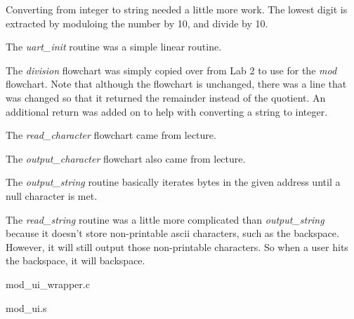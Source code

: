 \documentclass[letterpaper,10pt]{article}
\begin{document}
    Converting from integer to string needed a little more work. The lowest
    digit is extracted by moduloing the number by 10, and divide by 10.

    

    The \textit{uart\_init} routine was a simple linear routine.
    

    The \textit{division} flowchart was simply copied over from Lab 2 to use
    for the \textit{mod} flowchart. Note that although the flowchart is
    unchanged, there was a line that was changed so that it returned the
    remainder instead of the quotient. An additional return was added on
    to help with converting a string to integer.

    

    The \textit{read\_character} flowchart came from lecture.
    

    The \textit{output\_character} flowchart also came from lecture.
    

    The \textit{output\_string} routine basically iterates bytes in the given
    address until a null character is met.
    

    The \textit{read\_string} routine was a little more complicated than
    \textit{output\_string} because it doesn't store non-printable ascii
    characters, such as the backspace. However, it will still output those
    non-printable characters. So when a user hits the backspace, it will
    backspace.
    

    mod\_ui\_wrapper.c
    

    \newpage

    mod\_ui.s
    
\end{document}

